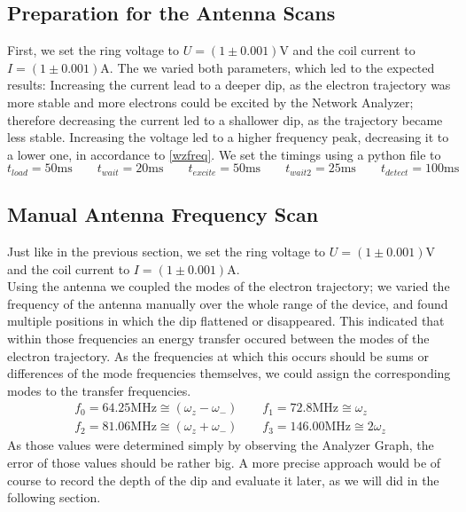 \documentclass[12pt]{article}
\begin{document}
\subsection{Preparation for the Antenna Scans}
First, we set the ring voltage to $ U=(1 \pm 0.001) \text{V} $ and the coil current to $ I=(1 \pm 0.001)\text{A} $. The we varied both parameters, which led to the expected results: Increasing the current lead to a deeper dip, as the electron trajectory was more stable and more electrons could be excited by the Network Analyzer; therefore decreasing the current led to a shallower dip, as the trajectory became less stable.
Increasing the voltage led to a higher frequency peak, decreasing it to a lower one, in accordance to \eqref{wzfreq}.
We set the timings using a python file to
\begin{equation*}
t_{load} = 50 \text{ms} \qquad
t_{wait} = 20 \text{ms} \qquad
t_{excite} = 50 \text{ms} \qquad
t_{wait2} = 25 \text{ms} \qquad
t_{detect} = 100 \text{ms}
\end{equation*}

\subsection{Manual Antenna Frequency Scan}
Just like in the previous section, we set the ring voltage to $ U=(1 \pm 0.001) \text{V} $ and the coil current to $ I=(1 \pm 0.001)\text{A} $.\\
Using the antenna we coupled the modes of the electron trajectory; we varied the frequency of the antenna manually over the whole range of the device, and found multiple positions in which the dip flattened or disappeared. This indicated that within those frequencies an energy transfer occured between the modes of the electron trajectory. As the frequencies at which this occurs should be sums or differences of the mode frequencies themselves, we could assign the corresponding modes to the transfer frequencies.
\begin{equation*}
\begin{aligned}
f_0 = 64.25 \text{MHz} \cong (\omega_z - \omega_-) \qquad f_1 = 72.8 \text{MHz} \cong \omega_z \\
f_2 = 81.06 \text{MHz} \cong (\omega_z + \omega_-)\qquad f_3 = 146.00 \text{MHz} \cong 2\omega_z
\end{aligned}
\end{equation*}
As those values were determined simply by observing the Analyzer Graph, the error of those values should be rather big. A more precise approach would be of course to record the depth of the dip and evaluate it later, as we will did in the following section.
\end{document}
